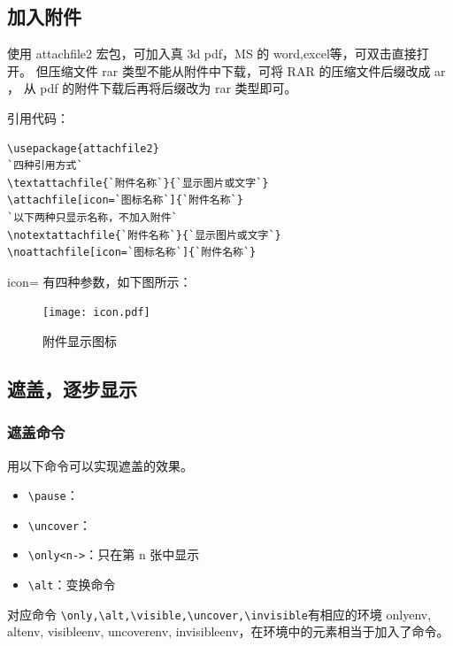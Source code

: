 \subsection{加入附件}


使用 attachfile2 宏包，可加入真 3d pdf，MS 的 word,excel等，可双击直接打开。
但压缩文件 rar 类型不能从附件中下载，可将 RAR 的压缩文件后缀改成 ar ，
从 pdf 的附件下载后再将后缀改为 rar 类型即可。

引用代码：
\begin{lstlisting}[language={[LaTeX]TeX}]
\usepackage{attachfile2}
`四种引用方式`
\textattachfile{`附件名称`}{`显示图片或文字`}
\attachfile[icon=`图标名称`]{`附件名称`}
`以下两种只显示名称，不加入附件`
\notextattachfile{`附件名称`}{`显示图片或文字`}
\noattachfile[icon=`图标名称`]{`附件名称`}
\end{lstlisting}

icon= 有四种参数，如下图所示：

\begin{figure}[htbp]%
\centering
\texttt{[image: icon.pdf]}
\caption{附件显示图标} \label{icon}
\end{figure}


\subsection{遮盖，逐步显示}

\subsubsection{遮盖命令}
用以下命令可以实现遮盖的效果。
\begin{itemize}
  \item \verb|\pause|：
  \item \verb|\uncover|：
  \item \verb|\only<n->|：只在第 n 张中显示
  \item \verb|\alt|：变换命令
\end{itemize}
对应命令 \verb|\only,\alt,\visible,\uncover,\invisible|有相应的环境 onlyenv, altenv, visibleenv, uncoverenv, invisibleenv，在环境中的元素相当于加入了命令。


